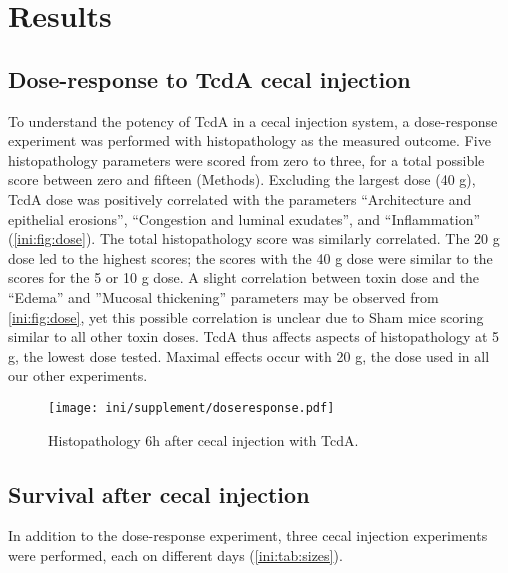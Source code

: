 \section{Results}

\subsection{Dose-response to TcdA cecal injection}

To understand the potency of TcdA in a cecal injection system, a dose-response
experiment was performed with histopathology as the measured outcome.
Five histopathology parameters were scored from zero to three, for a total possible score
between zero and fifteen (Methods). Excluding the largest dose (40 \textmugreek{}g),
TcdA dose was positively correlated with the parameters ``Architecture and epithelial erosions'', 
``Congestion and luminal exudates'', and
``Inflammation'' (\autoref{ini:fig:dose}). The total histopathology score was similarly correlated.
The 20 \textmugreek{}g dose led to the highest scores; the scores with
the 40 \textmugreek{}g dose were similar to the scores for the 5 or 10 \textmugreek{}g dose.
A slight correlation between toxin dose and the ``Edema'' and ''Mucosal thickening''
parameters may be observed from \autoref{ini:fig:dose}, yet this possible
correlation is unclear due to Sham mice scoring similar to all other toxin doses.
TcdA thus affects aspects of histopathology at 5 \textmugreek{}g, the lowest
dose tested. Maximal effects occur with 20 \textmugreek{}g, the dose used in all our
other experiments.

\begin{figure}[h!]
\centering
\texttt{[image: ini/supplement/doseresponse.pdf]}
\caption{Histopathology 6h after cecal injection with TcdA.}
\label{ini:fig:dose}
\end{figure}

\subsection{Survival after cecal injection}

In addition to the dose-response experiment, three cecal injection experiments were performed, each on
different days (\autoref{ini:tab:sizes}). 

